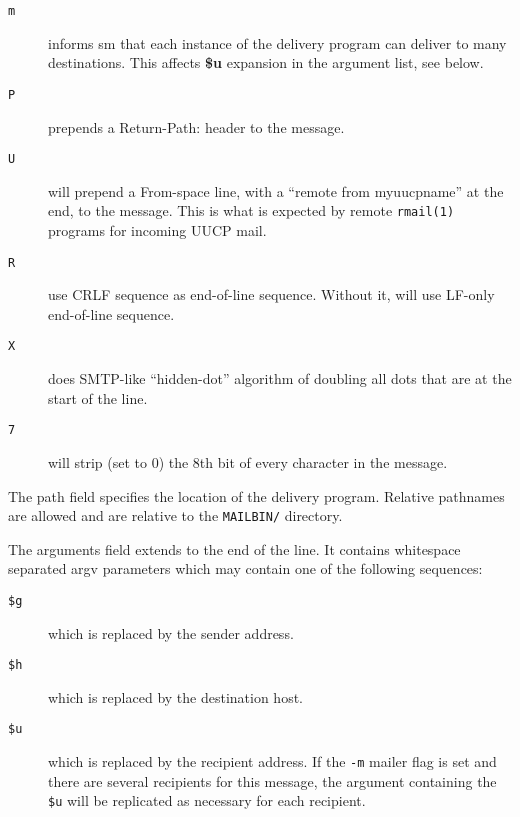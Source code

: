 \begin{description}
\item[ {\tt m}] \mbox{}
informs sm that each instance of the delivery program  
can deliver to many destinations. This affects {\bf \$u} expansion 
in the argument list, see below.

\item[ {\tt P}] \mbox{}
prepends a Return-Path: header to the message.

\item[ {\tt U}] \mbox{}
will prepend a From-space line, with a ``remote from
myuucpname'' at the end, to the message. This is what is expected by remote 
{\tt rmail(1)} programs for incoming UUCP mail.

\item[ {\tt R}] \mbox{}
use CRLF sequence as end-of-line sequence. Without
it, will use LF-only end-of-line sequence.

\item[ {\tt X}] \mbox{}
does SMTP-like ``hidden-dot'' algorithm  of doubling
all dots that are at the start of the line.

\item[ {\tt 7}] \mbox{}
will strip (set to 0) the 8th bit of every character in the 
message.

\end{description}


The path field specifies the location of the delivery program. Relative 
pathnames are allowed and are relative to the {\tt MAILBIN/} directory.

The arguments field extends to the end of the line. It
contains  whitespace separated  argv  parameters which may
contain one of the following sequences:

\begin{description}
\item[ {\tt \$g}] \mbox{}
which is replaced by the sender address.

\item[ {\tt \$h}] \mbox{}
which is replaced by the destination host.

\item[ {\tt \$u}] \mbox{}
which is replaced by the recipient address.  If the
{\tt -m} mailer flag is set and there are several recipients for this 
message, the argument containing  the {\tt \$u} will be replicated 
as necessary for each recipient.

\end{description}
